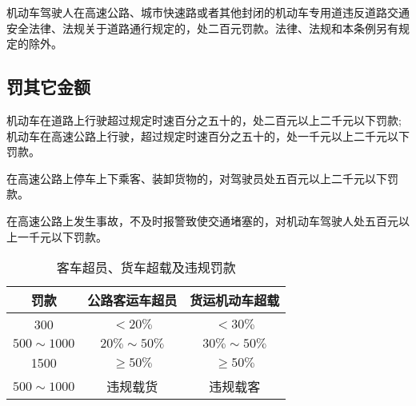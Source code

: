 机动车驾驶人在高速公路、城市快速路或者其他封闭的机动车专用道违反道路交通安全法律、法规关于道路通行规定的，处二百元罚款。法律、法规和本条例另有规定的除外。

\subsection*{罚其它金额}

机动车在道路上行驶超过规定时速百分之五十的，处二百元以上二千元以下罚款;机动车在高速公路上行驶，超过规定时速百分之五十的，处一千元以上二千元以下罚款。

在高速公路上停车上下乘客、装卸货物的，对驾驶员处五百元以上二千元以下罚款。

在高速公路上发生事故，不及时报警致使交通堵塞的，对机动车驾驶人处五百元以上一千元以下罚款。

% 
% 
% 
% 


\begin{table}[htbp]
\centering
\caption{客车超员、货车超载及违规罚款}
    \begin{tabular}{|c|c|c|}
        \hline
        \textbf{罚款}  & \textbf{公路客运车超员} & \textbf{货运机动车超载} \\
        \hline
        300 & $< 20\%$ & $< 30\%$ \\
        \hline
        $500 \sim 1000$ & $20\% \sim 50\%$ & $30\% \sim 50\%$ \\
        \hline
        1500 & $\ge 50\%$ & $\ge 50\%$ \\
        \hline
        $500 \sim 1000$ & 违规载货 & 违规载客 \\
        \hline
    \end{tabular}
    \label{tab:penalty}
\end{table}

